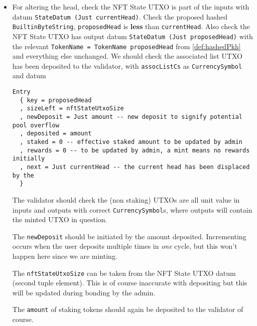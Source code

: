 \documentclass[10pt, a4paper]{article}
\theoremstyle{definition}
\begin{document}
\begin{enumerate}
{\begin{itemize}
{The \texttt{newDeposit} should be initiated by the amount deposited. Incrementing occurs when the user deposits multiple times in \textit{one} cycle, but this won't happen here since we are minting.

The \texttt{nftStateUtxoSize} can be taken from the NFT State UTXO datum (second tuple element). This is of course inaccurate with depositing but this will be updated during bonding by the admin.

The \texttt{amount} of staking UTXOs should be deposited to the validator of course.

Note: the initial head stake is equivalent to an initial tail stake so do not define the latter.
}

\item{
For altering the head, check the NFT State UTXO is part of the inputs with datum \texttt{StateDatum (Just currentHead)}. Check the proposed hashed \texttt{BuiltinByteString}, \texttt{proposedHead} is \textbf{less} than \texttt{currentHead}. Also check the NFT State UTXO has output datum \texttt{StateDatum (Just proposedHead)} with the relevant \texttt{TokenName = TokenName proposedHead} from \ref{def:hashedPkh} and everything else unchanged. We should check the associated list UTXO has been deposited to the validator, with \texttt{assocListCs} as \texttt{CurrencySymbol} and datum
\begin{verbatim}
Entry
  { key = proposedHead
  , sizeLeft = nftStateUtxoSize
  , newDeposit = Just amount -- new deposit to signify potential pool overflow
  , deposited = amount
  , staked = 0 -- effective staked amount to be updated by admin
  , rewards = 0 -- to be updated by admin, a mint means no rewards initially
  , next = Just currentHead -- the current head has been displaced by the
  }
\end{verbatim}
The validator should check the (non staking) UTXOs are all unit value in inputs and outputs with correct \texttt{CurrencySymbol}s, where outputs will contain the minted UTXO in question.

The \texttt{newDeposit} should be initiated by the amount deposited. Incrementing occurs when the user deposits multiple times in \textit{one} cycle, but this won't happen here since we are minting.

The \texttt{nftStateUtxoSize} can be taken from the NFT State UTXO datum (second tuple element). This is of course inaccurate with depositing but this will be updated during bonding by the admin.

The \texttt{amount} of staking tokens should again be deposited to the validator of course.
}

\end{itemize} 

}
\end{enumerate}
\end{document}

